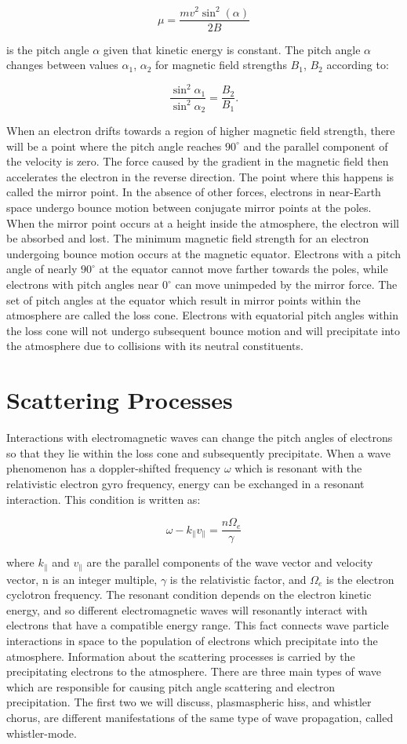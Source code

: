 $$\mu = \frac{mv^2 \sin^2(\alpha)}{2B}$$

is the pitch angle $\alpha$ given that kinetic energy is constant. The pitch angle $\alpha$ changes between values $\alpha_1$, $\alpha_2$ for magnetic field strengths $B_1$, $B_2$ according to:

$$\frac{\sin^2{\alpha_1}}{\sin^2{\alpha_2}} = \frac{B_2}{B_1}.$$

When an electron drifts towards a region of higher magnetic field strength, there will be a point where the pitch angle reaches $90^\circ$ and the parallel component of the velocity is zero. The force caused by the gradient in the magnetic field then accelerates the electron in the reverse direction. The point where this happens is called the mirror point. In the absence of other forces, electrons in near-Earth space undergo bounce motion between conjugate mirror points at the poles. When the mirror point occurs at a height inside the atmosphere, the electron will be absorbed and lost. The minimum magnetic field strength for an electron undergoing bounce motion occurs at the magnetic equator. Electrons with a pitch angle of nearly $90^\circ$ at the equator cannot move farther towards the poles, while electrons with pitch angles near $0^\circ$ can move unimpeded by the mirror force. The set of pitch angles at the equator which result in mirror points within the atmosphere are called the loss cone. Electrons with equatorial pitch angles within the loss cone will not undergo subsequent bounce motion and will precipitate into the atmosphere due to collisions with its neutral constituents.

\section{Scattering Processes}

Interactions with electromagnetic waves can change the pitch angles of electrons so that they lie within the loss cone and subsequently precipitate. When a wave phenomenon has a doppler-shifted frequency $\omega$ which is resonant with the relativistic electron gyro frequency, energy can be exchanged in a resonant interaction. This condition is written as:

$$\omega - k_{\parallel}v_{\parallel} = \frac{n\Omega_e}{\gamma}$$

where $k_{\parallel}$ and $v_{\parallel}$ are the parallel components of the wave vector and velocity vector, n is an integer multiple, $\gamma$ is the relativistic factor, and $\Omega_e$ is the electron cyclotron frequency. The resonant condition depends on the electron kinetic energy, and so different electromagnetic waves will resonantly interact with electrons that have a compatible energy range. This fact connects wave particle interactions in space to the population of electrons which precipitate into the atmosphere. Information about the scattering processes is carried by the precipitating electrons to the atmosphere. There are three main types of wave which are responsible for causing pitch angle scattering and electron precipitation. The first two we will discuss, plasmaspheric hiss, and whistler chorus, are different manifestations of the same type of wave propagation, called whistler-mode. 

